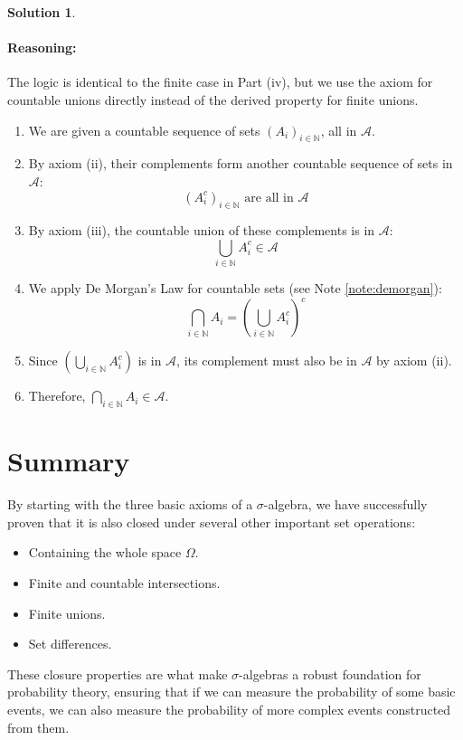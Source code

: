 \documentclass[11pt,a4paper]{article}
\theoremstyle{definition}
\newtheorem*{solution}{Solution}
\begin{document}
\begin{solution}
\paragraph{Reasoning:}
The logic is identical to the finite case in Part (iv), but we use the axiom for countable unions directly instead of the derived property for finite unions.
\begin{enumerate}
    \item We are given a countable sequence of sets $(A_i)_{i \in \mathbb{N}}$, all in $\mathcal{A}$.
    \item By axiom (ii), their complements form another countable sequence of sets in $\mathcal{A}$:
    \[ (A_i^c)_{i \in \mathbb{N}} \text{ are all in } \mathcal{A} \]
    \item By axiom (iii), the countable union of these complements is in $\mathcal{A}$:
    \[ \bigcup_{i \in \mathbb{N}} A_i^c \in \mathcal{A} \]
    \item We apply De Morgan's Law for countable sets (see Note \ref{note:demorgan}):
    \[ \bigcap_{i \in \mathbb{N}} A_i = \left( \bigcup_{i \in \mathbb{N}} A_i^c \right)^c \]
    \item Since $\left( \bigcup_{i \in \mathbb{N}} A_i^c \right)$ is in $\mathcal{A}$, its complement must also be in $\mathcal{A}$ by axiom (ii).
    \item Therefore, $\bigcap_{i \in \mathbb{N}} A_i \in \mathcal{A}$.
\end{enumerate}
\end{solution}

\section{Summary}
By starting with the three basic axioms of a $\sigma$-algebra, we have successfully proven that it is also closed under several other important set operations:
\begin{itemize}
    \item Containing the whole space $\Omega$.
    \item Finite and countable intersections.
    \item Finite unions.
    \item Set differences.
\end{itemize}
These closure properties are what make $\sigma$-algebras a robust foundation for probability theory, ensuring that if we can measure the probability of some basic events, we can also measure the probability of more complex events constructed from them.
\end{document}

